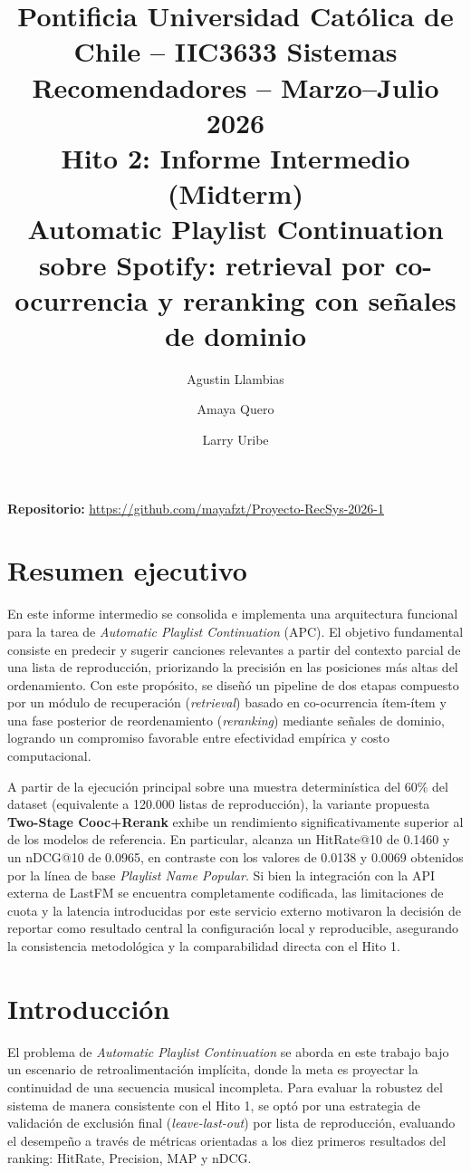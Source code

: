 \documentclass[10pt,letterpaper]{article}
\title{\vspace{-1.6cm}
\normalsize Pontificia Universidad Católica de Chile -- IIC3633 Sistemas Recomendadores -- Marzo--Julio 2026\\[0.2em]
\Large Hito 2: Informe Intermedio (Midterm)\\
\normalsize Automatic Playlist Continuation sobre Spotify: retrieval por co-ocurrencia y reranking con señales de dominio}
\author{Agustin Llambias \and Amaya Quero \and Larry Uribe}
\date{}
\begin{document}
\maketitle
\vspace{-0.8cm}

\begin{center}
\footnotesize \textbf{Repositorio:} \url{https://github.com/mayafzt/Proyecto-RecSys-2026-1}
\end{center}
\vspace{-0.35cm}

\section{Resumen ejecutivo}

En este informe intermedio se consolida e implementa una arquitectura funcional para la tarea de \textit{Automatic Playlist Continuation} (APC). El objetivo fundamental consiste en predecir y sugerir canciones relevantes a partir del contexto parcial de una lista de reproducción, priorizando la precisión en las posiciones más altas del ordenamiento. Con este propósito, se diseñó un pipeline de dos etapas compuesto por un módulo de recuperación (\textit{retrieval}) basado en co-ocurrencia ítem-ítem y una fase posterior de reordenamiento (\textit{reranking}) mediante señales de dominio, logrando un compromiso favorable entre efectividad empírica y costo computacional.

A partir de la ejecución principal sobre una muestra determinística del 60\% del dataset (equivalente a 120.000 listas de reproducción), la variante propuesta \textbf{Two-Stage Cooc+Rerank} exhibe un rendimiento significativamente superior al de los modelos de referencia. En particular, alcanza un HitRate@10 de 0.1460 y un nDCG@10 de 0.0965, en contraste con los valores de 0.0138 y 0.0069 obtenidos por la línea de base \textit{Playlist Name Popular}. Si bien la integración con la API externa de LastFM se encuentra completamente codificada, las limitaciones de cuota y la latencia introducidas por este servicio externo motivaron la decisión de reportar como resultado central la configuración local y reproducible, asegurando la consistencia metodológica y la comparabilidad directa con el Hito 1.

\section{Introducción}

El problema de \textit{Automatic Playlist Continuation} se aborda en este trabajo bajo un escenario de retroalimentación implícita, donde la meta es proyectar la continuidad de una secuencia musical incompleta. Para evaluar la robustez del sistema de manera consistente con el Hito 1, se optó por una estrategia de validación de exclusión final (\textit{leave-last-out}) por lista de reproducción, evaluando el desempeño a través de métricas orientadas a los diez primeros resultados del ranking: HitRate, Precision, MAP y nDCG.
\end{document}
